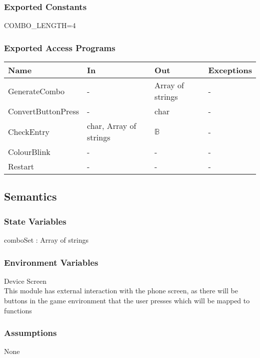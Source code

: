 \documentclass[12pt, titlepage]{article}
\begin{document}
\subsubsection{Exported Constants}
COMBO\_LENGTH=4

\subsubsection{Exported Access Programs}

\begin{center}
\begin{tabular}{p{5cm} p{4cm} p{4cm} p{2cm}}
\hline
\textbf{Name} & \textbf{In} & \textbf{Out} & \textbf{Exceptions} \\
\hline
GenerateCombo & - & Array of strings & - \\
ConvertButtonPress & - & char & - \\
CheckEntry & char, Array of strings & $\mathds{B}$ & - \\
ColourBlink & - & - & - \\
Restart & - & - & - \\
\hline
\end{tabular}
\end{center}

\subsection{Semantics}

\subsubsection{State Variables}

comboSet : Array of strings

\subsubsection{Environment Variables}

Device Screen\\
This module has external interaction with the phone screen, as there will be buttons in the game environment that the user presses which will be mapped to functions


\subsubsection{Assumptions}

None
\end{document}
